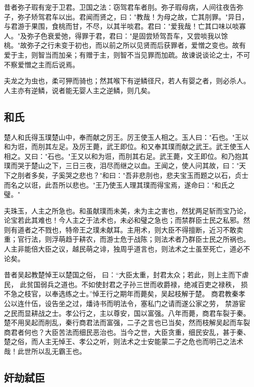 \documentclass[]{article}
\begin{document}
昔者弥子瑕有宠于卫君。卫国之法：窃驾君车者刖。弥子瑕母病，人间往夜告弥子，弥子矫驾君车以出。君闻而贤之，曰："教哉！为母之故，亡其刖罪。"异日，与君游于果围，食桃而甘，不尽，以其半啖君。君曰："爱我哉！亡其口味以啖寡人。"及弥子色衰爱弛，得罪于君，君曰："是固尝矫驾吾车，又尝啖我以馀桃。"故弥子之行未变于初也，而以前之所以见贤而后获罪者，爱憎之变也。故有爱于主，则智当而加亲；有赠于主，则智不当见罪而加疏。故谏说谈论之士，不可不察爱憎之主而后说焉。

夫龙之为虫也，柔可狎而骑也；然其喉下有逆鳞径尺，若人有婴之者，则必杀人。人主亦有逆鳞，说者能无婴人主之逆鳞，则几矣。

\hypertarget{header-n897}{%
\subsection{和氏}\label{header-n897}}

楚人和氏得玉璞楚山中，奉而献之厉王。厉王使玉人相之。玉人曰："石也。"王以和为诳，而刖其左足。及厉王薨，武王即位。和又奉其璞而献之武王。武王使玉人相之。又曰："石也。"王又以和为诳，而刖其右足。武王薨，文王即位。和乃抱其璞而哭于楚山之下，三日三夜，泪尽而继之以血。王闻之，使人问其故，曰："天下之刖者多矣，子奚哭之悲也？"和曰："吾非悲刖也，悲夫宝玉而题之以石，贞士而名之以诳，此吾所以悲也。"王乃使玉人理其璞而得宝焉，遂命曰："和氏之璧。"

夫珠玉，人主之所急也。和虽献璞而未美，未为主之害也，然犹两足斩而宝乃论，论宝若此其难也！今人主之于法术也，未必和璧之急也；而禁群臣士民之私邪。然则有道者之不戮也，特帝王之璞未献耳。主用术，则大臣不得擅断，近习不敢卖重；官行法，则浮萌趋于耕农，而游士危于战陈；则法术者乃群臣士民之所祸也。人主非能倍大臣之议，越民萌之诽，独周乎道言也，则法术之士虽至死亡，道必不论矣。

昔者吴起教楚悼王以楚国之俗，
曰：``大臣太重，封君太众；若此，则上主而下虐民，
此贫国弱兵之道也。不如使封君之子孙三世而收爵禄，绝减百吏之禄秩，
损不急之枝官，以奉选练之士。''悼王行之期年而薨矣，吴起枝解于楚。
商君教秦孝公以连什伍，设告坐之过，燔诗书而明法令，塞私门之请而遂公家之劳，
禁游宦之民而显耕战之士。孝公行之，主以尊安，国以富强。八年而薨，商君车裂于秦。楚不用吴起而削乱，秦行商君法而富强，二子之言也已当矣，然而枝解吴起而车裂商君者何也？大臣苦法而细民恶治也。当今之世，大臣贪重，细民安乱，甚于秦、楚之俗，而人主无悼王、孝公之听，则法术之士安能蒙二子之危也而明己之法术哉！此世所以乱无霸王也。

\hypertarget{header-n902}{%
\subsection{奸劫弑臣}\label{header-n902}}
\end{document}
